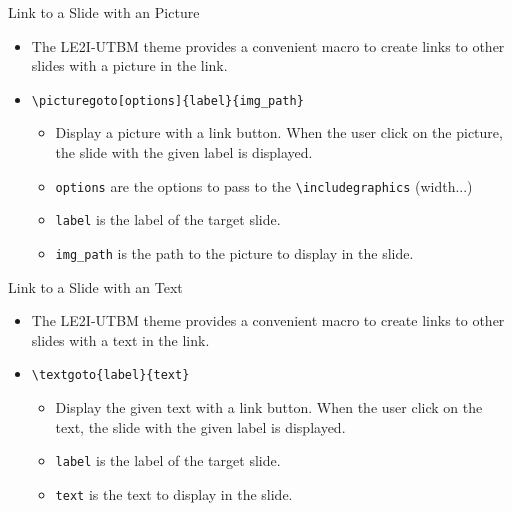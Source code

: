 \documentclass[english,sectioncirclenumberstyle]{le2iutbmbeamer}
\begin{document}
\begin{frame}[t]{Link to a Slide with an Picture}
	\begin{itemize}
	\item The LE2I-UTBM theme provides a convenient macro to create links to other slides with a picture in the link.
	\item \texttt{{\textbackslash}picturegoto[options]\{label\}\{img\_path\}}
		\begin{itemize}
		\item Display a picture with a link button. When the user click on the picture, the slide with the given label is displayed.
		\item \texttt{options} are the options to pass to the \texttt{{\textbackslash}includegraphics} (width...)
		\item \texttt{label} is the label of the target slide.
		\item \texttt{img\_path} is the path to the picture to display in the slide.
		\end{itemize}
	\end{itemize}
	\begin{center}
	\end{center}
\end{frame}

\begin{frame}{Link to a Slide with an Text}
	\begin{itemize}
	\item The LE2I-UTBM theme provides a convenient macro to create links to other slides with a text in the link.
	\item \texttt{{\textbackslash}textgoto\{label\}\{text\}}
		\begin{itemize}
		\item Display the given text with a link button. When the user click on the text, the slide with the given label is displayed.
		\item \texttt{label} is the label of the target slide.
		\item \texttt{text} is the text to display in the slide.
		\end{itemize}
	\end{itemize}
	\begin{center}
	\end{center}
\end{frame}


\end{document}
